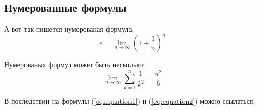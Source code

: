\subsection{Нумерованные формулы} \label{subsect1_3_3}

А вот так пишется нумерованая формула:
\begin{equation}
  \label{eq:equation1}
  e = \lim_{n \to \infty} \left( 1+\frac{1}{n} \right) ^n
\end{equation}

Нумерованых формул может быть несколько:
\begin{equation}
  \label{eq:equation2}
  \lim_{n \to \infty} \sum_{k=1}^n \frac{1}{k^2} = \frac{\pi^2}{6}
\end{equation}

В последствии на формулы (\ref{eq:equation1}) и (\ref{eq:equation2}) можно ссылаться.


\clearpage